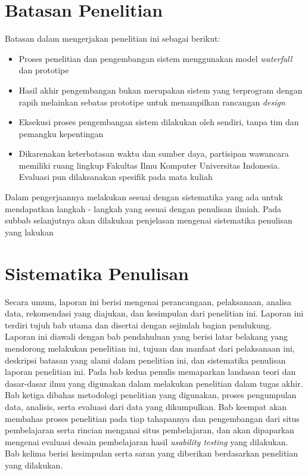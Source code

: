 \section{Batasan Penelitian}
Batasan dalam mengerjakan penelitian ini sebagai berikut:
\begin{itemize}
	\item Proses penelitian dan pengembangan sistem menggunakan model \textit{waterfall} dan prototipe
	\item Hasil akhir pengembangan bukan merupakan sistem yang terprogram dengan rapih melainkan sebatas prototipe untuk menampilkan rancangan \textit{design}
	\item Eksekusi proses pengembangan sistem dilakukan oleh \saya sendiri, tanpa tim dan pemangku kepentingan
	\item Dikarenakan keterbatasan waktu dan sumber daya, partisipan wawancara memiliki ruang lingkup  Fakultas Ilmu Komputer Universitas Indonesia. Evaluasi pun dilaksanakan spesifik pada mata kuliah \ddp
\end{itemize}
Dalam pengerjaannya \saya melakukan sesuai dengan sistematika yang ada untuk mendapatkan langkah - langkah yang sesuai dengan penulisan ilmiah. Pada subbab selanjutnya akan dilakukan penjelasan mengenai sistematika penulisan yang lakukan
\section{Sistematika Penulisan}
Secara umum, laporan ini berisi mengenai perancangaan, pelaksanaan, analisa data, rekomendasi yang diajukan, dan kesimpulan dari penelitian ini. Laporan ini terdiri tujuh bab utama dan disertai dengan sejimlah bagian pendukung. Laporan ini diawali dengan bab pendahuluan yang berisi latar belakang yang mendorong \saya melakukan penelitian ini, tujuan dan manfaat dari pelaksanaan ini, deskripsi batasan yang \saya alami dalam penelitian ini, dan sistematika penulisan laporan penelitian ini. Pada bab kedua penulis memaparkan landasan teori dan dasar-dasar ilmu yang
digunakan dalam melakukan penelitian dalam tugas akhir. Bab ketiga dibahas
metodologi penelitian yang digunakan, proses pengumpulan data, analisis, serta
evaluasi dari data yang dikumpulkan. Bab keempat akan membahas proses penelitian
pada tiap tahapannya dan pengembangan dari situs pembelajaran serta rincian
menganai situs pembelajaran, dan akan dipaparkan mengenai evaluasi desain pembelajaran hasil \textit{usability testing} yang dilakukan. Bab kelima berisi kesimpulan serta saran yang diberikan berdasarkan penelitian yang dilakukan.